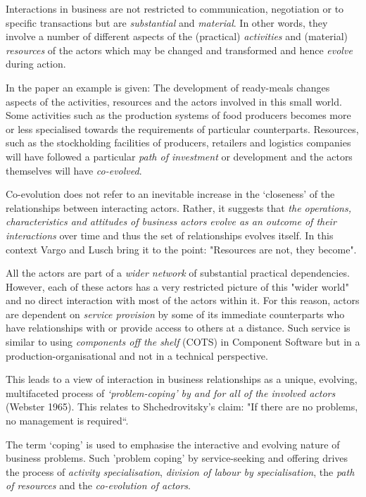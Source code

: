 \documentclass[11pt,a4paper]{article}
\begin{document}
Interactions in business are not restricted to communication, negotiation or
to speciﬁc transactions but are \emph{substantial} and \emph{material}. In
other words, they involve a number of different aspects of the (practical)
\emph{activities} and (material) \emph{resources} of the actors which may be
changed and transformed and hence \emph{evolve} during action.

In the paper an example is given: The development of ready-meals changes
aspects of the activities, resources and the actors involved in this small
world. Some activities such as the production systems of food producers
becomes more or less specialised towards the requirements of particular
counterparts.  Resources, such as the stockholding facilities of producers,
retailers and logistics companies will have followed a particular \emph{path
  of investment} or development and the actors themselves will have
\emph{co-evolved}.

Co-evolution does not refer to an inevitable increase in the ‘closeness’ of
the relationships between interacting actors. Rather, it suggests that
\emph{the operations, characteristics and attitudes of business actors evolve
  as an outcome of their interactions} over time and thus the set of
relationships evolves itself.  In this context Vargo and Lusch bring it to the
point: "Resources are not, they become".

All the actors are part of a \emph{wider network} of substantial practical
dependencies.  However, each of these actors has a very restricted picture of
this "wider world" and no direct interaction with most of the actors within
it.  For this reason, actors are dependent on \emph{service provision} by some
of its immediate counterparts who have relationships with or provide access to
others at a distance. Such service is similar to using \emph{components off
  the shelf} (COTS) in Component Software but in a production-organisational
and not in a technical perspective.

This leads to a view of interaction in business relationships as a unique,
evolving, multifaceted process of \emph{‘problem-coping’ by and for all of the
  involved actors} (Webster 1965). This relates to Shchedrovitsky's claim:
"If there are no problems, no management is required“.

The term ‘coping’ is used to emphasise the interactive and evolving nature of
business problems.  Such 'problem coping' by service-seeking and offering
drives the process of \emph{activity specialisation}, \emph{division of labour
  by specialisation}, the \emph{path of resources} and the \emph{co-evolution
  of actors}.
\end{document}
